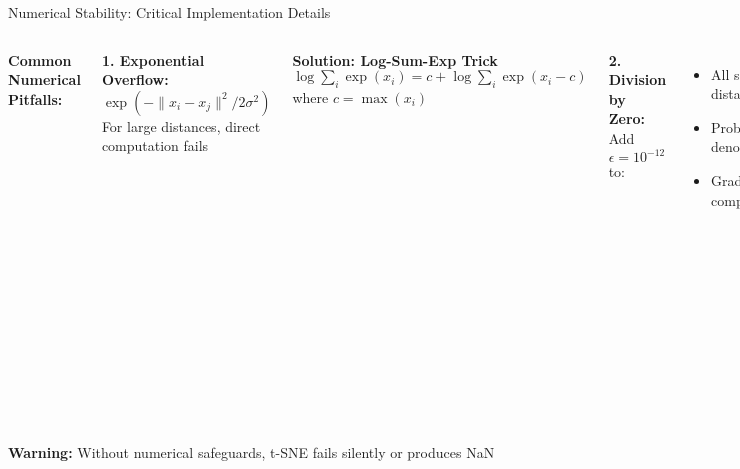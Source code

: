 \documentclass[aspectratio=169]{beamer}
\newcommand{\warning}[1]{\colorbox{red!10}{\textcolor{warningcolor}{\textbf{Warning:} #1}}}
\begin{document}
\begin{frame}{Numerical Stability: Critical Implementation Details}
\begin{columns}
\textbf{Common Numerical Pitfalls:}

\textbf{1. Exponential Overflow:}
$\exp(-\|x_i-x_j\|^2/2\sigma^2)$
For large distances, direct computation fails

\textbf{Solution: Log-Sum-Exp Trick}
$\log\sum_i \exp(x_i) = c + \log\sum_i \exp(x_i - c)$
where $c = \max(x_i)$

\textbf{2. Division by Zero:}
Add $\epsilon = 10^{-12}$ to:
\begin{itemize}
\item All squared distances
\item Probability denominators
\item Gradient computations
\end{itemize}

\textbf{3. Log of Zero:}
$\log(p_{ij}) \to \log(p_{ij} + \epsilon)$

\textbf{4. Catastrophic Cancellation:}
Avoid $(1 + x) - 1$ when $x \ll 1$

\textbf{Precision Analysis:}


\vspace{0.2cm}
\textbf{Gradient Clipping:}

If $\|\nabla C\| > \tau$:
$\nabla C \leftarrow \tau \cdot \frac{\nabla C}{\|\nabla C\|}$
Typical $\tau = 100$

\textbf{Memory Considerations:}

\begin{itemize}
\item Use float32 not float64 (4× savings)
\item Sparse P matrix (only k-NN)
\item Batch distance computation
\item Memory-mapped arrays for huge datasets
\end{itemize}
\end{columns}

\vspace{0.3cm}
\warning{Without numerical safeguards, t-SNE fails silently or produces NaN}
\end{frame}
\end{document}
